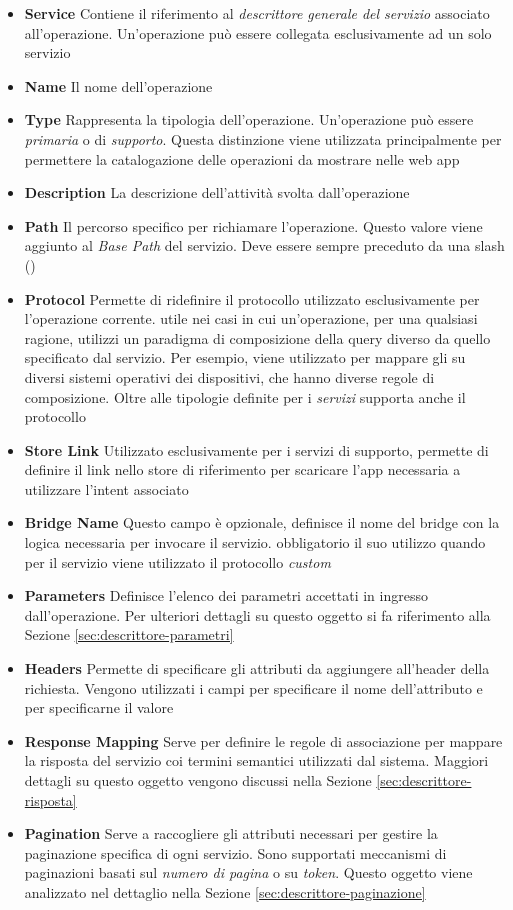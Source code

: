 \begin{itemize}
	\item \textbf{Service}
	Contiene il riferimento al \emph{descrittore generale del servizio} associato all'operazione. Un'operazione può essere collegata esclusivamente ad un solo servizio
	\item \textbf{Name}
	Il nome dell'operazione
	\item \textbf{Type}
	Rappresenta la tipologia dell'operazione. Un'operazione può essere \emph{primaria} o di \emph{supporto}. Questa distinzione viene utilizzata principalmente per permettere la catalogazione delle operazioni da mostrare nelle web app
	\item \textbf{Description}
	La descrizione dell'attività svolta dall'operazione
	\item \textbf{Path}
	Il percorso specifico per richiamare l'operazione. Questo valore viene aggiunto al \emph{Base Path} del servizio. Deve essere sempre preceduto da una slash (\virgolette{/})
	\item \textbf{Protocol}
	Permette di ridefinire il protocollo utilizzato esclusivamente per l'operazione corrente. \upe utile nei casi in cui un'operazione, per una qualsiasi ragione, utilizzi un paradigma di composizione della query diverso da quello specificato dal servizio. Per esempio, viene utilizzato per mappare gli  su diversi sistemi operativi dei dispositivi, che hanno diverse regole di composizione. Oltre alle tipologie definite per i \emph{servizi} supporta anche il protocollo 
	\item \textbf{Store Link}
	Utilizzato esclusivamente per i servizi di supporto, permette di definire il link nello store di riferimento per scaricare l'app necessaria a utilizzare l'intent associato
	\item \textbf{Bridge Name}
	Questo campo è opzionale, definisce il nome del bridge con la logica necessaria per invocare il servizio. \upe obbligatorio il suo utilizzo quando per il servizio viene utilizzato il protocollo \emph{custom}
	\item \textbf{Parameters}
	Definisce l'elenco dei parametri accettati in ingresso dall'o\-pe\-ra\-zio\-ne. Per ulteriori dettagli su questo oggetto si fa riferimento alla Sezione \ref{sec:descrittore-parametri}
	\item \textbf{Headers}
	Permette di specificare gli attributi da aggiungere all'header della richiesta. Vengono utilizzati i campi  per specificare il nome dell'at\-tri\-bu\-to e  per specificarne il valore
	\item \textbf{Response Mapping}
	Serve per definire le regole di associazione per mappare la risposta del servizio coi termini semantici utilizzati dal sistema. Maggiori dettagli su questo oggetto vengono discussi nella Sezione \ref{sec:descrittore-risposta}
	\item \textbf{Pagination}
	Serve a raccogliere gli attributi necessari per gestire la paginazione specifica di ogni servizio. Sono supportati meccanismi di paginazioni basati sul \emph{numero di pagina} o su \emph{token}. Questo oggetto viene analizzato nel dettaglio nella Sezione \ref{sec:descrittore-paginazione}
\end{itemize}

